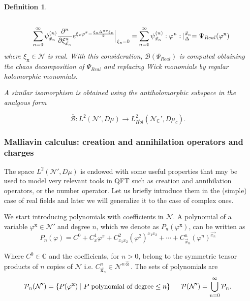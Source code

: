 \documentclass[12pt]{article}%
\newcommand{\mb}[1]{{\mathbf{#1}}}
\newtheorem{definition}{Definition}%
\begin{document}
\begin{definition}
\begin{equation*}
\begin{split}
        \\
        \hspace{ 2 em}\sum_{n=0}^\infty \psi^{(n)}_{\vec{x}_n}\frac{\partial^n}{\partial \xi^n_{\vec{x}_n}}e^{\xi_x\varphi^x-\frac{\xi_u\Delta^{uv}\xi_v}{2}}\Big\lvert_{\xi_\mathbf{x}=0}&=
        \sum_{n=0}^\infty \psi^{(n)}_{\vec{x}_n}:\varphi^n:\lvert_{{\Delta}}^{\vec{x}_n}=
         \Psi_{Real}(\varphi^{\mathbf{x}})
        \end{split}
    \end{equation*}
    where $\xi_\mathbf{x}\in \mathcal{N}$ is real.   With this consideration,  $\mathcal{B}(\Psi_{Real})$ is computed obtaining the chaos decomposition of  $\Psi_{Real}$ and replacing Wick monomials by regular holomorphic monomials. 
    
    A similar isomorphism is obtained using the antiholomorphic subspace in the analgous form
    
    $$
    \overline{\mathcal{B}} :L^2(\mathcal{N}',D\mu)   \longrightarrow  L_{\overline{Hol}}^2(\mathcal{N}_{\mathbb{C}}',D\mu_c).
    $$
\end{definition}





\subsubsection{Malliavin calculus: creation and annihilation operators and charges}

The space $L^2(\mathcal{N}',D\mu)$ is endowed with some useful properties that may be used to model very relevant tools in QFT such as creation and annihilation operators, or the number operator. Let us briefly introduce them in the (simple) case of real fields and later we will generalize it to the case of complex ones.

We start introducing  polynomials with coefficients in $\mathcal{N}$. A polynomial of  a variable $\varphi^{\mb{x}}\in \mathcal{N}'$ and degree $n$, which we denote as $P_n(\varphi^\mb{x})$,  can be written as
\begin{equation}
\label{eq:polynomials} 
P_n(\varphi)= C^0+C^1_x\varphi^x+C^{2}_{x_1x_2}(\varphi^2)^{x_1x_2}+\cdots+C^n_{\vec{x}_n}(\varphi^n)^{\vec{x_n}}
\end{equation}    

Where $C^0\in\mathbb{C}$ and the coefficients, for $n>0$, belong to the symmetric tensor products of $n$ copies of $\mathcal{N}$ i.e. $C^n_{\vec{\mathbf{x}}_n}\in \mathcal{N}^{n\hat{\otimes}}$. The sets of polynomials are
\begin{gather}
\label{eq:degnpolynomials}
\mathcal{P}_n(\mathcal{N}')=\left\{P(\varphi^{\mb{x}})\mid P\textrm{ polynomial of degree} \leq n\right\}\hspace{0.5 cm}
\mathcal{P}(\mathcal{N}')= \bigcup_{n=0}^\infty \mathcal{P}_n.
\end{gather}
\end{document}
